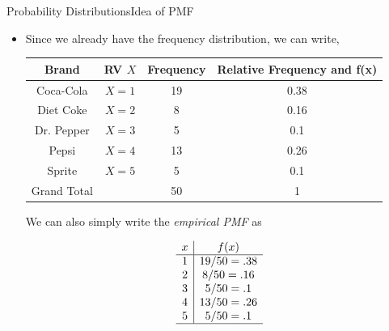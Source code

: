 \documentclass[8pt, usepdftitle = false]{beamer}
\begin{document}
\begin{frame}[allowframebreaks]{Probability Distributions}{Idea of PMF}
\begin{itemize}
\framebreak


Here we can think about a random experiment, that is \emph{sales of the $51$st soft drink}, Now we can think about a random variable $X$ that represents soft drink brand. And here is how we can think about a random variable (Keep in mind that a random variable is always a number!)

\medskip
\begin{align*}
X = 1 &\text{ for Coca-Cola} \\
X = 2 &\text{ for Diet Coke} \\
X = 3 &\text{ for Dr. Pepper} \\
X = 4 &\text{ for Pepsi} \\
X = 5 &\text{ for Sprite} \\
\end{align*}



\item Since we already have the frequency distribution, we can write,


    \begin{table}[H]
    \begin{tabular}{c|c|c|c}
      \hline Brand & RV $X$ & Frequency & Relative Frequency and f(x)\\
      \hline Coca-Cola & $X = 1$ & 19 & 0.38 \\
      \hline Diet Coke & $X = 2$ & 8 & 0.16  \\
      \hline Dr. Pepper & $X = 3$ & 5 & 0.1  \\
      \hline Pepsi & $X = 4$ & 13 & 0.26  \\
      \hline Sprite & $X = 5$ & 5 & 0.1  \\
      \hline Grand Total & & 50 & 1  \\
      \hline
\end{tabular}
  \end{table}


\medskip

We can also simply write the \emph{empirical PMF} as

\begin{table}
\centering
\begin{align*}
\begin{array}{c|c}
x & f(x)  \\ \hline
1 & 19/50 = .38 \\
2 & 8/50 = .16 \\
3 & 5/50 = .1 \\
4 & 13/50 = .26 \\
5 & 5/50 = .1 \\
\hline
\end{array}
\end{align*}
\end{table}


\end{itemize}
\end{frame}
\end{document}
